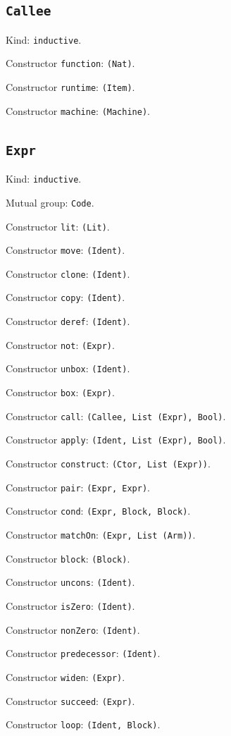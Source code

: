 \documentclass[11pt]{article}
\begin{document}
\subsection*{\texttt{Callee}}
\noindent Kind: \texttt{inductive}.\par
\noindent Constructor \texttt{function}: \texttt{(Nat)}.\par
\noindent Constructor \texttt{runtime}: \texttt{(Item)}.\par
\noindent Constructor \texttt{machine}: \texttt{(Machine)}.\par
\subsection*{\texttt{Expr}}
\noindent Kind: \texttt{inductive}.\par
\noindent Mutual group: \texttt{Code}.\par
\noindent Constructor \texttt{lit}: \texttt{(Lit)}.\par
\noindent Constructor \texttt{move}: \texttt{(Ident)}.\par
\noindent Constructor \texttt{clone}: \texttt{(Ident)}.\par
\noindent Constructor \texttt{copy}: \texttt{(Ident)}.\par
\noindent Constructor \texttt{deref}: \texttt{(Ident)}.\par
\noindent Constructor \texttt{not}: \texttt{(Expr)}.\par
\noindent Constructor \texttt{unbox}: \texttt{(Ident)}.\par
\noindent Constructor \texttt{box}: \texttt{(Expr)}.\par
\noindent Constructor \texttt{call}: \texttt{(Callee, List (Expr), Bool)}.\par
\noindent Constructor \texttt{apply}: \texttt{(Ident, List (Expr), Bool)}.\par
\noindent Constructor \texttt{construct}: \texttt{(Ctor, List (Expr))}.\par
\noindent Constructor \texttt{pair}: \texttt{(Expr, Expr)}.\par
\noindent Constructor \texttt{cond}: \texttt{(Expr, Block, Block)}.\par
\noindent Constructor \texttt{matchOn}: \texttt{(Expr, List (Arm))}.\par
\noindent Constructor \texttt{block}: \texttt{(Block)}.\par
\noindent Constructor \texttt{uncons}: \texttt{(Ident)}.\par
\noindent Constructor \texttt{isZero}: \texttt{(Ident)}.\par
\noindent Constructor \texttt{nonZero}: \texttt{(Ident)}.\par
\noindent Constructor \texttt{predecessor}: \texttt{(Ident)}.\par
\noindent Constructor \texttt{widen}: \texttt{(Expr)}.\par
\noindent Constructor \texttt{succeed}: \texttt{(Expr)}.\par
\noindent Constructor \texttt{loop}: \texttt{(Ident, Block)}.\par
\end{document}
